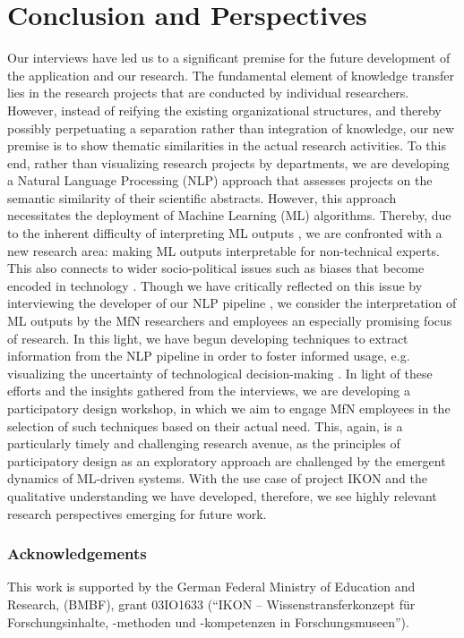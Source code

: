 \documentclass{article}
\begin{document}
\section{Conclusion and Perspectives} 
Our interviews have led us to a significant premise for the future development of the application and our research. The fundamental element of knowledge transfer lies in the research projects that are conducted by individual researchers. However, instead of reifying the existing organizational structures, and thereby possibly perpetuating a separation rather than integration of knowledge, our new premise is to show thematic similarities in the actual research activities. To this end, rather than visualizing research projects by departments, we are developing a Natural Language Processing (NLP) approach that assesses projects on the semantic similarity of their scientific abstracts. However, this approach necessitates the deployment of Machine Learning (ML) algorithms. Thereby, due to the inherent difficulty of interpreting ML outputs \cite{doshi-velez_considerations_2018}, we are confronted with a new research area: making ML outputs interpretable for non-technical experts. This also connects to wider socio-political issues such as biases that become encoded in technology \cite{baeza-yates_bias_2018, benjamin_materializing_2019}. Though we have critically reflected on this issue by interviewing the developer of our NLP pipeline \cite{benjamin_transparency_2018}, we consider the interpretation of ML outputs by the MfN researchers and employees an especially promising focus of research. In this light, we have begun developing techniques to extract information from the NLP pipeline in order to foster informed usage, e.g. visualizing the uncertainty of technological decision-making \cite{kinkeldey_towards_2019}. In light of these efforts and the insights gathered from the interviews, we are developing a participatory design workshop, in which we aim to engage MfN employees in the selection of such techniques based on their actual need. This, again, is a particularly timely and challenging research avenue, as the principles of participatory design as an exploratory approach are challenged by the emergent dynamics \cite{dourish_algorithms_2016} of ML-driven systems. With the use case of project IKON and the qualitative understanding we have developed, therefore, we see highly relevant research perspectives emerging for future work.

\subsubsection*{Acknowledgements}
This work is supported by the German Federal Ministry of Education and Research, (BMBF), grant 03IO1633 (``{IKON} -- Wissenstransferkonzept f\"{u}r Forschungsinhalte, {-methoden} und {-kompetenzen} in Forschungsmuseen'').
\end{document}
